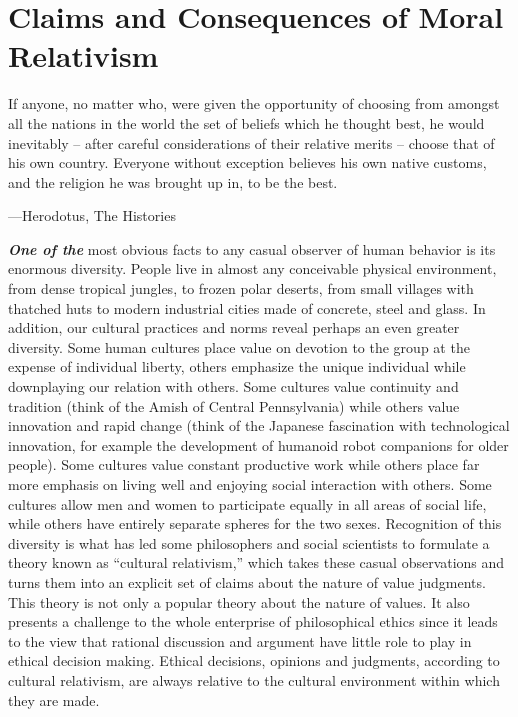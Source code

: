 \documentclass[]{book}
\newenvironment{epigraph}%
{
\begin{flushright}
\begin{minipage}{20em}
\begin{flushright}
\itshape
}%
{
\end{flushright}
\end{minipage}
\end{flushright}
\vspace{1em}
}
\begin{document}
\hypertarget{claims-and-consequences-of-moral-relativism}{%
\section{Claims and Consequences of Moral Relativism}\label{claims-and-consequences-of-moral-relativism}}

\begin{epigraph}
If anyone, no matter who, were given the opportunity of choosing from
amongst all the nations in the world the set of beliefs which he thought
best, he would inevitably -- after careful considerations of their
relative merits -- choose that of his own country. Everyone without
exception believes his own native customs, and the religion he was
brought up in, to be the best.

---Herodotus, The Histories
\end{epigraph}

\textbf{\emph{One of the}} most obvious facts to any casual observer of human behavior is its enormous diversity. People live in almost any conceivable physical environment, from dense tropical jungles, to frozen polar deserts, from small villages with thatched huts to modern industrial cities made of concrete, steel and glass. In addition, our cultural practices and norms reveal perhaps an even greater diversity. Some human cultures place value on devotion to the group at the expense of individual liberty, others emphasize the unique individual while downplaying our relation with others. Some cultures value continuity and tradition (think of the Amish of Central Pennsylvania) while others value innovation and rapid change (think of the Japanese fascination with technological innovation, for example the development of humanoid robot companions for older people). Some cultures value constant productive work while others place far more emphasis on living well and enjoying social interaction with others. Some cultures allow men and women to participate equally in all areas of social life, while others have entirely separate spheres for the two sexes. Recognition of this diversity is what has led some philosophers and social scientists to formulate a theory known as ``cultural relativism,'' which takes these casual observations and turns them into an explicit set of claims about the nature of value judgments. This theory is not only a popular theory about the nature of values. It also presents a challenge to the whole enterprise of philosophical ethics since it leads to the view that rational discussion and argument have little role to play in ethical decision making. Ethical decisions, opinions and judgments, according to cultural relativism, are always relative to the cultural environment within which they are made.
\end{document}
